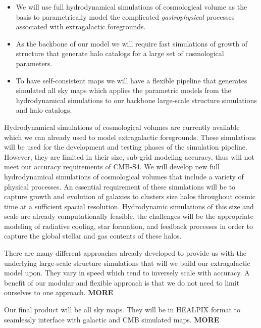 \begin{itemize}
\item We will use full hydrodynamical simulations of cosmological volume as the basis to parametrically model the complicated {\it gastrophysical} processes associated with extragalactic foregrounds.
\item As the backbone of our model we will require fast simulations of growth of structure that generate halo catalogs for a large set of cosmological parameters.
\item To have self-consistent maps we will have a flexible pipeline that generates simulated all sky maps which applies the parametric models from the hydrodynamical simulations to our backbone large-scale structure simulations and halo catalogs.
\end{itemize}

Hydrodynamical simulations of cosmological volumes are currently available which we can already used to model extragalactic foregrounds. These simulations will be used for the development and testing phases of the simulation pipeline. However, they are limited in their size, sub-grid modeling accuracy, thus will not meet our accuracy requirements of CMB-S4. We will develop new full hydrodynamical simulations of cosmological volumes that include a variety of physical processes. An essential requirement of these simulations will be to capture growth and evolution of galaxies to clusters size halos throughout cosmic time at a sufficient spacial resolution. Hydrodynamic simulations of this size and scale are already computationally feasible, the challenges will be the appropriate modeling of radiative cooling, star formation, and feedback processes in order to capture the global stellar and gas contents of these halos.

There are many different approaches already developed to provide us with the underlying large-scale structure simulations that will we build our extragalactic model upon. They vary in speed which tend to inversely scale with accuracy. A benefit of our modular and flexible approach is that we do not need to limit ourselves to one approach. {\bf MORE}

Our final product will be all sky maps. They will be in HEALPIX format to seamlessly interface with galactic and CMB simulated maps.
{\bf MORE}

%



